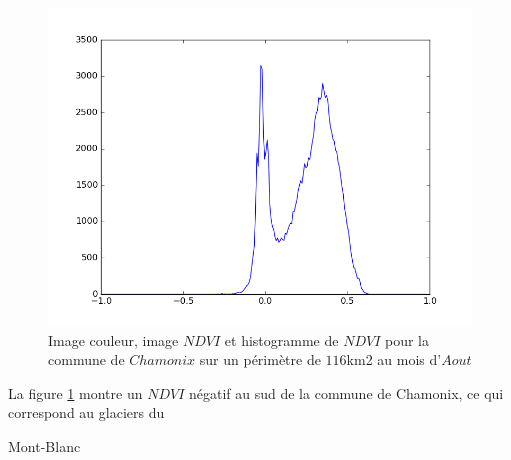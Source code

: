\documentclass{book}
\begin{document}
\begin{figure}[H]
{}
\begin{center}
\includegraphics[scale=0.45]{images/Chamonix/08_ndvi_histo.png}
\end{center}
\caption{Image couleur, image $NDVI$ et histogramme de $NDVI$ pour la commune de $Chamonix$ sur un périmètre de $116$km2 au mois d'$Aout$}
\label{chamonix_ndvi}
\end{figure}

La figure \ref{chamonix_ndvi} montre un $NDVI$ négatif au sud de la commune de Chamonix, ce qui correspond au glaciers du \begin{itshape}Mont-Blanc\end{itshape}\\

\clearpage 
\end{document}
